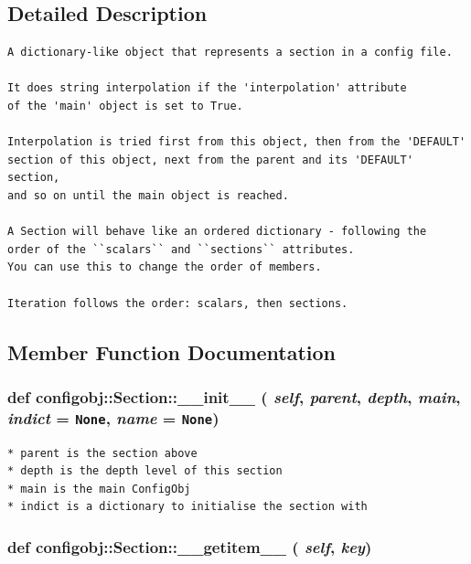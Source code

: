 \subsection{Detailed Description}


\footnotesize\begin{verbatim}
A dictionary-like object that represents a section in a config file.

It does string interpolation if the 'interpolation' attribute
of the 'main' object is set to True.

Interpolation is tried first from this object, then from the 'DEFAULT'
section of this object, next from the parent and its 'DEFAULT' section,
and so on until the main object is reached.

A Section will behave like an ordered dictionary - following the
order of the ``scalars`` and ``sections`` attributes.
You can use this to change the order of members.

Iteration follows the order: scalars, then sections.
\end{verbatim}
\normalsize
 



\subsection{Member Function Documentation}
\subsubsection{\setlength{\rightskip}{0pt plus 5cm}def configobj::Section::\_\-\_\-init\_\-\_\- ( {\em self},  {\em parent},  {\em depth},  {\em main},  {\em indict} = {\tt None},  {\em name} = {\tt None})}\label{classconfigobj_1_1Section_104414e2201178fd4bebf34291736fea}




\footnotesize\begin{verbatim}
* parent is the section above
* depth is the depth level of this section
* main is the main ConfigObj
* indict is a dictionary to initialise the section with
\end{verbatim}
\normalsize
\subsubsection{\setlength{\rightskip}{0pt plus 5cm}def configobj::Section::\_\-\_\-getitem\_\-\_\- ( {\em self},  {\em key})}\label{classconfigobj_1_1Section_8dd2609e5aad758406ca31be54013e36}




